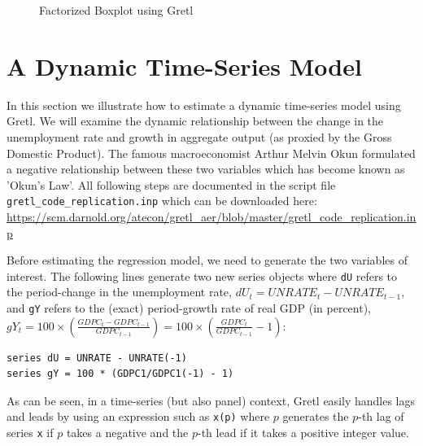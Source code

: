 \documentclass[11pt]{article}
\begin{document}
\begin{figure}[h!]
	\centering
	\caption{Factorized Boxplot using Gretl}	
	\label{fig:Plot2}
\end{figure}



\section{A Dynamic Time-Series Model}
In this section we illustrate how to estimate a dynamic time-series model using Gretl. We will examine the dynamic relationship between the change in the unemployment rate and growth in aggregate output (as proxied by the Gross Domestic Product). The famous macroeconomist Arthur Melvin Okun formulated a negative relationship between these two variables which has become known as 'Okun's Law'. All following steps are documented in the script file \texttt{gretl\_code\_replication.inp} which can be downloaded here: \url{https://scm.darnold.org/atecon/gretl_aer/blob/master/gretl_code_replication.inp}

Before estimating the regression model, we need to generate the two variables of interest. The following lines generate two new series objects where \texttt{dU} refers to the period-change in the unemployment rate, $ dU_t = UNRATE_t - UNRATE_{t-1} $, and \texttt{gY} refers to the (exact) period-growth rate of real GDP (in percent), $ gY_t =  100 \times \left( \frac{GDPC_t - GDPC_{t-1}}{GDPC_{t-1}}\right) = 100 \times \left( \frac{GDPC_t}{GDPC_{t-1}}-1 \right)$:
\begin{Verbatim}[baselinestretch=0.75, fontsize=\small]
series dU = UNRATE - UNRATE(-1)
series gY = 100 * (GDPC1/GDPC1(-1) - 1)
\end{Verbatim}
As can be seen, in a time-series (but also panel) context, Gretl easily handles lags and leads by using an expression such as \texttt{x(p)} where $ p $ generates the $ p $-th lag of series \texttt{x} if $p$  takes a negative and the $ p $-th lead if it takes a positive integer value.
\end{document}
